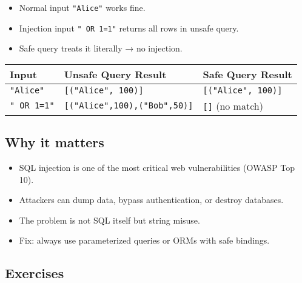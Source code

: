 \documentclass[
  letterpaper,
  DIV=11,
  numbers=noendperiod]{scrreprt}
\providecommand{\tightlist}{%
  \setlength{\itemsep}{0pt}\setlength{\parskip}{0pt}}
\begin{document}
\begin{itemize}
\tightlist
\item
  Normal input \texttt{"Alice"} works fine.
\item
  Injection input
  \texttt{"\textquotesingle{}\ OR\ \textquotesingle{}1\textquotesingle{}=\textquotesingle{}1"}
  returns all rows in unsafe query.
\item
  Safe query treats it literally → no injection.
\end{itemize}

\begin{longtable}[]{@{}lll@{}}
\toprule\noalign{}
Input & Unsafe Query Result & Safe Query Result \\
\midrule\noalign{}
\endhead
\bottomrule\noalign{}
\endlastfoot
\texttt{"Alice"} & \texttt{{[}("Alice",\ 100){]}} &
\texttt{{[}("Alice",\ 100){]}} \\
\texttt{"\textquotesingle{}\ OR\ \textquotesingle{}1\textquotesingle{}=\textquotesingle{}1"}
& \texttt{{[}("Alice",100),("Bob",50){]}} & \texttt{{[}{]}} (no
match) \\
\end{longtable}

\subsection{Why it matters}\label{why-it-matters-59}

\begin{itemize}
\tightlist
\item
  SQL injection is one of the most critical web vulnerabilities (OWASP
  Top 10).
\item
  Attackers can dump data, bypass authentication, or destroy databases.
\item
  The problem is not SQL itself but string misuse.
\item
  Fix: always use parameterized queries or ORMs with safe bindings.
\end{itemize}

\subsection{Exercises}\label{exercises-58}
\end{document}
